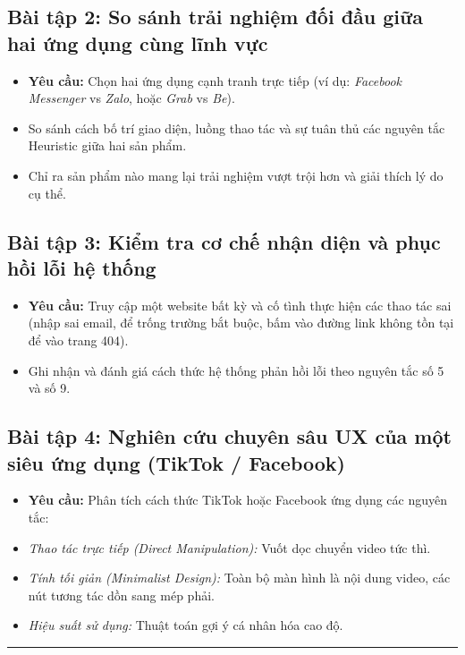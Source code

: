 \documentclass[11pt,a4paper,oneside]{report}
\begin{document}
\subsection{Bài tập 2: So sánh trải nghiệm đối đầu giữa hai ứng dụng cùng lĩnh vực}
\begin{itemize}[leftmargin=1.5em]
\item \textbf{Yêu cầu:} Chọn hai ứng dụng cạnh tranh trực tiếp (ví dụ: \textit{Facebook Messenger} vs \textit{Zalo}, hoặc \textit{Grab} vs \textit{Be}).
\item So sánh cách bố trí giao diện, luồng thao tác và sự tuân thủ các nguyên tắc Heuristic giữa hai sản phẩm.
\item Chỉ ra sản phẩm nào mang lại trải nghiệm vượt trội hơn và giải thích lý do cụ thể.
\end{itemize}

\subsection{Bài tập 3: Kiểm tra cơ chế nhận diện và phục hồi lỗi hệ thống}
\begin{itemize}[leftmargin=1.5em]
\item \textbf{Yêu cầu:} Truy cập một website bất kỳ và cố tình thực hiện các thao tác sai (nhập sai email, để trống trường bắt buộc, bấm vào đường link không tồn tại để vào trang 404).
\item Ghi nhận và đánh giá cách thức hệ thống phản hồi lỗi theo nguyên tắc số 5 và số 9.
\end{itemize}

\subsection{Bài tập 4: Nghiên cứu chuyên sâu UX của một siêu ứng dụng (TikTok / Facebook)}
\begin{itemize}[leftmargin=1.5em]
\item \textbf{Yêu cầu:} Phân tích cách thức TikTok hoặc Facebook ứng dụng các nguyên tắc:
\item \textit{Thao tác trực tiếp (Direct Manipulation):} Vuốt dọc chuyển video tức thì.
\item \textit{Tính tối giản (Minimalist Design):} Toàn bộ màn hình là nội dung video, các nút tương tác dồn sang mép phải.
\item \textit{Hiệu suất sử dụng:} Thuật toán gợi ý cá nhân hóa cao độ.
\end{itemize}

\bigskip\hrule\bigskip
\end{document}

